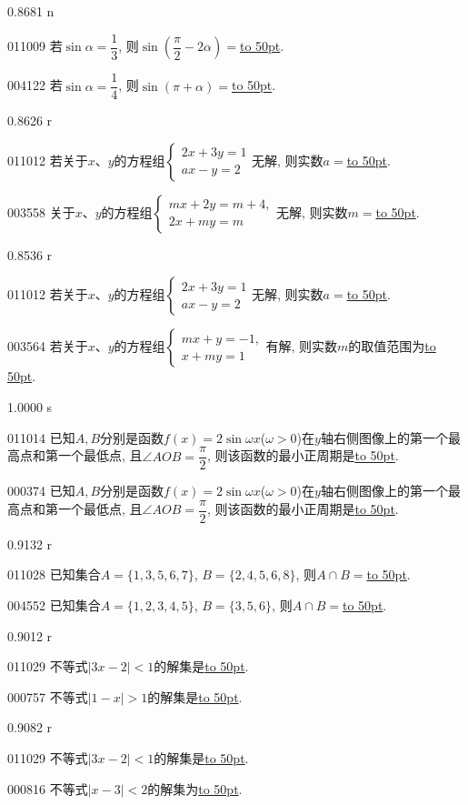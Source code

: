 \documentclass[10pt,a4paper]{article}
\newcommand{\blank}[1]{\underline{\hbox to #1pt{}}}
\begin{document}
0.8681 n

011009	若$\sin \alpha =\dfrac 13$, 则$\sin (\dfrac \pi 2-2\alpha)=$\blank{50}.

004122	若$\sin\alpha=\dfrac 14$, 则$\sin(\pi+\alpha)=$\blank{50}.

0.8626 r

011012	若关于$x$、$y$的方程组$\begin{cases} 2x+3y=1 \\ ax-y=2 \end{cases}$无解, 则实数$a=$\blank{50}.

003558	关于$x$、$y$的方程组$\begin{cases} mx+2y=m+4, \\ 2x+my=m \end{cases}$无解, 则实数$m=$\blank{50}.

0.8536 r

011012	若关于$x$、$y$的方程组$\begin{cases} 2x+3y=1 \\ ax-y=2 \end{cases}$无解, 则实数$a=$\blank{50}.

003564	若关于$x$、$y$的方程组$\begin{cases} mx+y=-1,\\ x+my=1 \end{cases}$有解, 则实数$m$的取值范围为\blank{50}.

1.0000 s

011014	已知$A,B$分别是函数$f(x)=2\sin \omega x$($\omega >0$)在$y$轴右侧图像上的第一个最高点和第一个最低点, 且$\angle AOB=\dfrac\pi 2$, 则该函数的最小正周期是\blank{50}.

000374	已知$A,B$分别是函数$f(x)=2\sin \omega x$($\omega >0$)在$y$轴右侧图像上的第一个最高点和第一个最低点, 且$\angle AOB=\dfrac\pi 2$, 则该函数的最小正周期是\blank{50}.

0.9132 r

011028	已知集合$A=\{1,3,5,6,7\}$, $B=\{2,4,5,6,8\}$, 则$A\cap B=$\blank{50}.

004552	已知集合$A=\{1,2,3,4,5\}$, $B=\{3,5,6\}$, 则$A\cap B=$\blank{50}.

0.9012 r

011029	不等式$|3x-2|<1$的解集是\blank{50}.

000757	不等式$|1-x|>1$的解集是\blank{50}.

0.9082 r

011029	不等式$|3x-2|<1$的解集是\blank{50}.

000816	不等式$|x-3|<2$的解集为\blank{50}.
\end{document}
